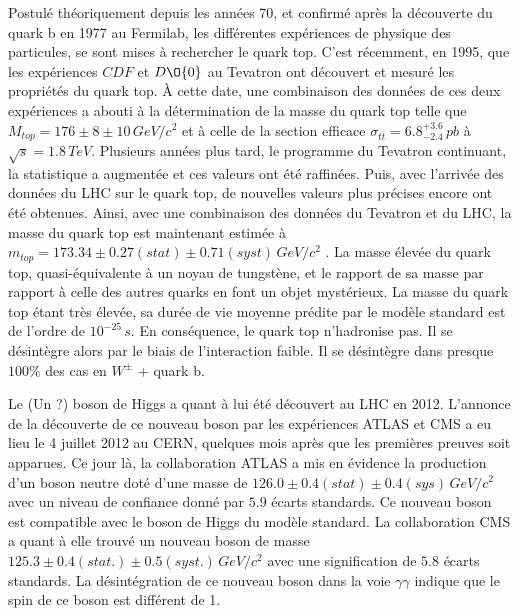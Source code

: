   Postul\'e th\'eoriquement depuis les ann\'ees 70, et confirm\'e apr\`es la d\'ecouverte du quark b en 1977 au Fermilab, les diff\'erentes exp\'eriences de physique des particules, se sont mises \`a rechercher le quark top. C'est r\'ecemment, en 1995, que les exp\'eriences $CDF$ et $D\O{0}$ au Tevatron ont d\'ecouvert et mesur\'e les propri\'et\'es du quark top. \`A cette date, une combinaison des donn\'ees de ces deux exp\'eriences a abouti \`a la d\'etermination de la masse du quark top telle que $M_{top} = 176 \pm 8 \pm 10 \, GeV/c^2$ \cite{Abe:1995hr} et \`a celle de la section efficace  $\sigma_{t\overline{t}} = 6.8^{+3.6}_{-2.4} \, pb$ \cite{Abe:1995hr} \`a $\sqrt{s} = 1.8 \, TeV$. Plusieurs ann\'ees plus tard, le programme du Tevatron continuant, la statistique a augment\'ee et ces valeurs ont \'et\'e raffin\'ees. Puis, avec l'arriv\'ee des donn\'ees du LHC sur le quark top, de nouvelles valeurs plus pr\'ecises encore ont \'et\'e obtenues. Ainsi, avec une combinaison des donn\'ees du Tevatron et du LHC, la masse du quark top est maintenant estim\'ee \`a $m_{top} = 173.34 \pm 0.27 (stat) \pm 0.71 (syst) \, GeV/c^2$ \cite{ATLAS:2014wva}. La masse \'elev\'ee du quark top, quasi-équivalente \`a un noyau de tungst\`ene, et le rapport de sa masse par rapport \`a celle des autres quarks en font un objet myst\'erieux. La masse du quark top \'etant tr\`es \'elev\'ee, sa dur\'ee de vie moyenne pr\'edite par le mod\`ele standard est de l'ordre de $10^{-25} \, s$. En cons\'equence, le quark top n'hadronise pas. Il se d\'esint\`egre alors par le biais de l'interaction faible. Il se d\'esint\`egre dans presque $100 \%$ des cas en $W^{\pm}$ + quark b.
  
  \medskip

  Le (Un ?) boson de Higgs a quant \`a lui \'et\'e d\'ecouvert au LHC en 2012. L'annonce de la d\'ecouverte de ce nouveau boson par les exp\'eriences ATLAS \cite{Aad:2012tfa} et CMS \cite{Chatrchyan:2012ufa} a eu lieu le 4 juillet 2012 au CERN, quelques mois apr\`es que les premi\`eres preuves soit apparues. Ce jour l\`a, la collaboration ATLAS a mis en \'evidence la production d'un boson neutre dot\'e d'une masse de  $126.0 \pm 0.4 (stat) \pm 0.4 (sys) \, GeV/c^2$ avec un niveau de confiance donn\'e par $5.9$ \'ecarts standards. Ce nouveau boson est compatible avec le boson de Higgs du mod\`ele standard. La collaboration CMS a quant \`a elle trouv\'e un nouveau boson de masse $125.3 \pm 0.4 (stat.) \pm 0.5 (syst.) \, GeV/c^2$ avec une signification de $5.8$ \'ecarts standards. La d\'esint\'egration de ce nouveau boson dans la voie $\gamma \gamma$ indique que le spin de ce boson est diff\'erent de 1.
  
